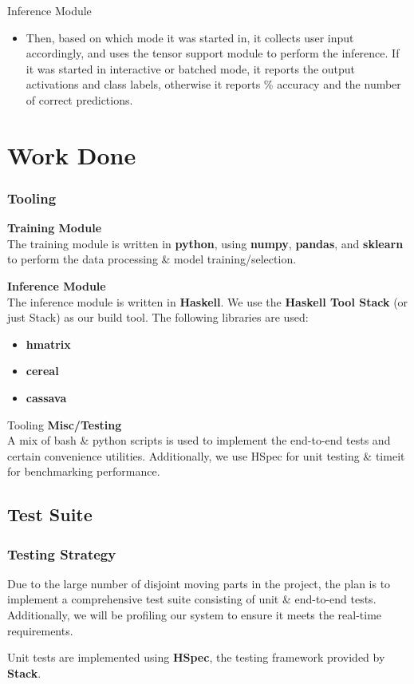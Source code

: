 \documentclass{beamer}
\begin{document}
\begin{frame}{Inference Module}
  \begin{itemize}
    \item Then, based on which mode it was started in, it collects user input accordingly, and uses the tensor support module to perform the inference. If it was started in interactive or batched mode, it reports the output activations and class labels, otherwise it reports \% accuracy and the number of correct predictions.
  \end{itemize}
\end{frame}

\section{Work Done}

\begin{frame}
  \frametitle{Tooling}

  \textbf{Training Module}\\
  The training module is written in \textbf{python}, using \textbf{numpy}, \textbf{pandas}, and \textbf{sklearn} to perform the data processing \& model training/selection.\bigskip

  \textbf{Inference Module}\\
  The inference module is written in \textbf{Haskell}. We use the \textbf{Haskell Tool Stack} (or just Stack) as our build tool. The following libraries are used:
  \begin{itemize}
    \item \textbf{hmatrix}
    \item \textbf{cereal}
    \item \textbf{cassava}
  \end{itemize}
\end{frame}

\begin{frame}{Tooling}
  \textbf{Misc/Testing}\\
  A mix of bash \& python scripts is used to implement the end-to-end tests and certain convenience utilities. Additionally, we use HSpec for unit testing \& timeit for benchmarking performance.
\end{frame}

\subsection{Test Suite}

\begin{frame}
  \frametitle{Testing Strategy}
  
  Due to the large number of disjoint moving parts in the project, the plan is to implement a comprehensive test suite consisting of unit \& end-to-end tests. Additionally, we will be profiling our system to ensure it meets the real-time requirements.\bigskip

  Unit tests are implemented using \textbf{HSpec}, the testing framework provided by \textbf{Stack}.
\end{frame}
\end{document}
